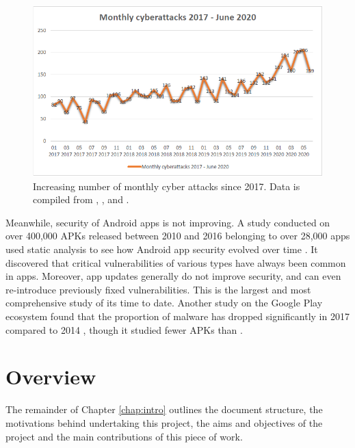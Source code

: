 		\begin{figure}[h]
            \centering
            \includegraphics[width=1\textwidth]{graphics/threatscape_chart.PNG}
            \caption{Increasing number of monthly cyber attacks since 2017. Data is compiled from \cite{pt_threatscape_2018}, \cite{pt_threatscape_2019}, \cite{pt_threatscape_2020} and              \cite{pt_threatscape_2020q2}.}
            \label{fig:no_attacks_evolution}
        \end{figure}
		
        Meanwhile, security of Android apps is not improving. A study conducted on over 400,000 APKs released between 2010 and 2016 belonging to over 28,000 apps used static analysis to see how Android app security evolved over time \cite{android_vulnerabilities_evolution}. It discovered that critical vulnerabilities of various types have always been common in apps. Moreover, app updates generally do not improve security, and can even re-introduce previously fixed vulnerabilities. This is the largest and most comprehensive study of its time to date. Another study on the Google Play ecosystem found that the proportion of malware has dropped significantly in 2017 compared to 2014 \cite{newer_android_vulnerabilities_evolution}, though it studied fewer APKs than \cite{android_vulnerabilities_evolution}.
        
    \section{Overview}  
		\label{sec:intro_overview} 
		
		The remainder of Chapter \ref{chap:intro} outlines the document structure, the motivations behind undertaking this project, the aims and objectives of the project and the main contributions of this piece of work.
		

